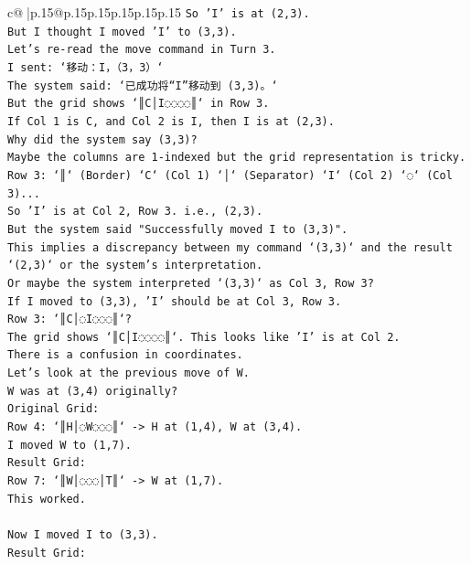 \documentclass{article}
\begin{document}
{\begin{supertabular}{c@{$\;$}|p{.15\linewidth}@{}p{.15\linewidth}p{.15\linewidth}p{.15\linewidth}p{.15\linewidth}p{.15\linewidth}}
{{{\texttt{So 'I' is at (2,3).} \\
\texttt{But I thought I moved 'I' to (3,3).} \\
\texttt{Let's re{-}read the move command in Turn 3.} \\
\texttt{I sent: `移动：I，（3，3）`} \\
\texttt{The system said: `已成功将“I”移动到 (3,3)。`} \\
\texttt{But the grid shows `║C│I◌◌◌◌║` in Row 3.} \\
\texttt{If Col 1 is C, and Col 2 is I, then I is at (2,3).} \\
\texttt{Why did the system say (3,3)?} \\
\texttt{Maybe the columns are 1{-}indexed but the grid representation is tricky.} \\
\texttt{Row 3: `║` (Border) `C` (Col 1) `│` (Separator) `I` (Col 2) `◌` (Col 3)...} \\
\texttt{So 'I' is at Col 2, Row 3. i.e., (2,3).} \\
\texttt{But the system said "Successfully moved I to (3,3)".} \\
\texttt{This implies a discrepancy between my command `(3,3)` and the result `(2,3)` or the system's interpretation.} \\
\texttt{Or maybe the system interpreted `(3,3)` as Col 3, Row 3?} \\
\texttt{If I moved to (3,3), 'I' should be at Col 3, Row 3.} \\
\texttt{Row 3: `║C│◌I◌◌◌║`?} \\
\texttt{The grid shows `║C│I◌◌◌◌║`. This looks like 'I' is at Col 2.} \\
\texttt{There is a confusion in coordinates.} \\
\texttt{Let's look at the previous move of W.} \\
\texttt{W was at (3,4) originally?} \\
\texttt{Original Grid:} \\
\texttt{Row 4: `║H│◌W◌◌◌║` {-}> H at (1,4), W at (3,4).} \\
\texttt{I moved W to (1,7).} \\
\texttt{Result Grid:} \\
\texttt{Row 7: `║W│◌◌◌│T║` {-}> W at (1,7).} \\
\texttt{This worked.} \\
\\ 
\texttt{Now I moved I to (3,3).} \\
\texttt{Result Grid:} \\
}}}
\end{supertabular}}
\end{document}
